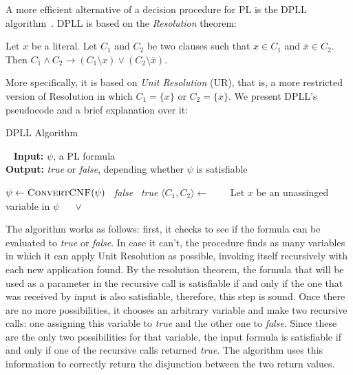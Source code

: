 A more efficient alternative of a decision procedure for PL is the DPLL algorithm~\cite{dpll}. DPLL is based on the \textit{Resolution} theorem:

\begin{theorem}[Resolution]
Let $x$ be a literal. Let $C_{1}$ and $C_{2}$ be two clauses such that $x \in C_{1}$ and $\overline x \in C_{2}$. Then $C_{1} \wedge C_{2} \rightarrow (C_{1} \setminus x) \vee (C_{2} \setminus \overline x)$.
\end{theorem}

More specifically, it is based on \textit{Unit Resolution} (UR), that is, a more restricted version of Resolution in which $C_{1} = \{x\}$ or $C_{2} = \{\overline x\}$. We present DPLL's pseudocode and a brief explanation over it:

\begin{algorithm}[H]
\caption{DPLL Algorithm}~\label{dpllAlgo}
\textbf{Input:} $\psi$, a PL formula\\
\textbf{Output:} \textit{true} or \textit{false}, depending whether $\psi$ is satisfiable
\begin{algorithmic}
\State $\psi \gets \Call{ConvertCNF}{\psi}$
  \State \Return~\textit{false}
  \State \Return~\textit{true}
\Else
    \State $\langle C_{1}, C_{2} \rangle \gets$  
    \State~\Return~
  \Else
    \State~Let $x$ be an unassinged variable in $\psi$
    \State~\Return~ $\vee$ 
  \EndIf
\EndIf
\EndFunction
\end{algorithmic}
\end{algorithm}

The algorithm works as follows: first, it checks to see if the formula can be evaluated to \textit{true} or \textit{false}. In case it can't, the procedure finds as many variables in which it can apply Unit Resolution as possible, invoking itself recursively with each new application found. By the resolution theorem, the formula that will be used as a parameter in the recursive call is satisfiable if and only if the one that was received by input is also satisfiable, therefore, this step is sound. Once there are no more possibilities, it chooses an arbitrary variable and make two recursive calls: one assigning this variable to \textit{true} and the other one to \textit{false}. Since these are the only two possibilities for that variable, the input formula is satisfiable if and only if one of the recursive calls returned \textit{true}. The algorithm uses this information to correctly return the disjunction between the two return values.

